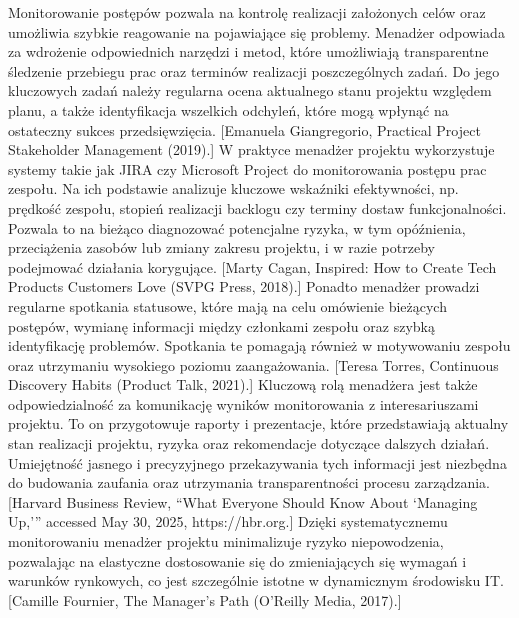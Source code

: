 Monitorowanie postępów pozwala na kontrolę realizacji założonych celów oraz umożliwia szybkie reagowanie na pojawiające się problemy. Menadżer odpowiada za wdrożenie odpowiednich narzędzi i metod, które umożliwiają transparentne śledzenie przebiegu prac oraz terminów realizacji poszczególnych zadań. Do jego kluczowych zadań należy regularna ocena aktualnego stanu projektu względem planu, a także identyfikacja wszelkich odchyleń, które mogą wpłynąć na ostateczny sukces przedsięwzięcia. [Emanuela Giangregorio, Practical Project Stakeholder Management (2019).] W praktyce menadżer projektu wykorzystuje systemy takie jak JIRA czy Microsoft Project do monitorowania postępu prac zespołu. Na ich podstawie analizuje kluczowe wskaźniki efektywności, np. prędkość zespołu, stopień realizacji backlogu czy terminy dostaw funkcjonalności. Pozwala to na bieżąco diagnozować potencjalne ryzyka, w tym opóźnienia, przeciążenia zasobów lub zmiany zakresu projektu, i w razie potrzeby podejmować działania korygujące. [Marty Cagan, Inspired: How to Create Tech Products Customers Love (SVPG Press, 2018).] Ponadto menadżer prowadzi regularne spotkania statusowe, które mają na celu omówienie bieżących postępów, wymianę informacji między członkami zespołu oraz szybką identyfikację problemów. Spotkania te pomagają również w motywowaniu zespołu oraz utrzymaniu wysokiego poziomu zaangażowania. [Teresa Torres, Continuous Discovery Habits (Product Talk, 2021).] Kluczową rolą menadżera jest także odpowiedzialność za komunikację wyników monitorowania z interesariuszami projektu. To on przygotowuje raporty i prezentacje, które przedstawiają aktualny stan realizacji projektu, ryzyka oraz rekomendacje dotyczące dalszych działań. Umiejętność jasnego i precyzyjnego przekazywania tych informacji jest niezbędna do budowania zaufania oraz utrzymania transparentności procesu zarządzania. [Harvard Business Review, “What Everyone Should Know About ‘Managing Up,’” accessed May 30, 2025, https://hbr.org.] Dzięki systematycznemu monitorowaniu menadżer projektu minimalizuje ryzyko niepowodzenia, pozwalając na elastyczne dostosowanie się do zmieniających się wymagań i warunków rynkowych, co jest szczególnie istotne w dynamicznym środowisku IT. [Camille Fournier, The Manager’s Path (O’Reilly Media, 2017).]

